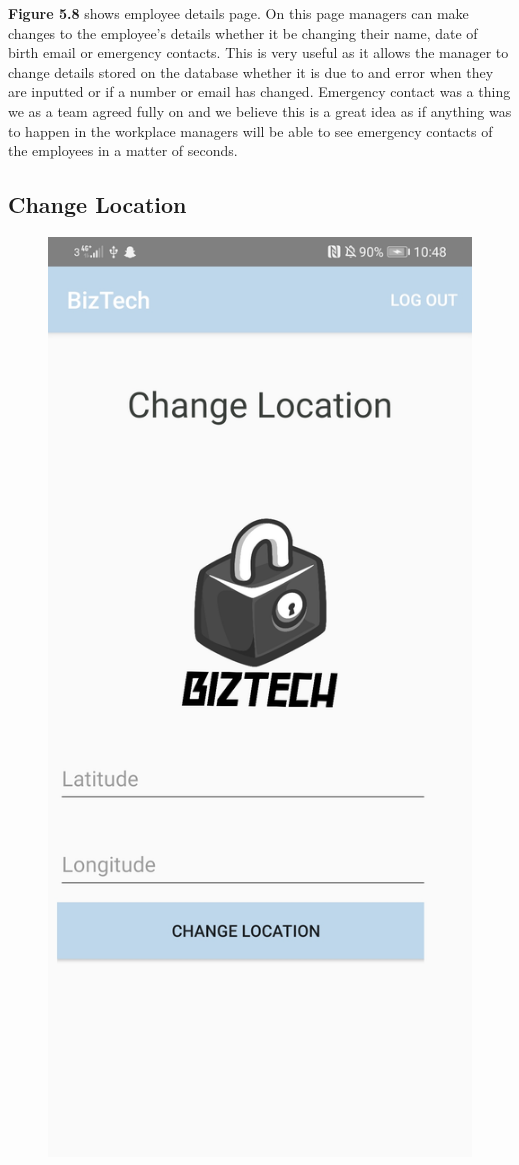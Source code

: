 \textbf{Figure 5.8} shows employee details page. On this page managers can make changes to the employee’s details whether it be changing their name, date of birth email or emergency contacts. This is very useful as it allows the manager to change details stored on the database whether it is due to and error when they are inputted or if a number or email has changed. Emergency contact was a thing we as a team agreed fully on and we believe this is a great idea as if anything was to happen in the workplace managers will be able to see emergency contacts of the employees in a matter of seconds.
\FloatBarrier

\subsection{Change Location}
\begin{figure}[!htb]
    \centering
    \includegraphics[scale=0.15]{img/ChangeLocationPage.jpg}

\end{figure}
